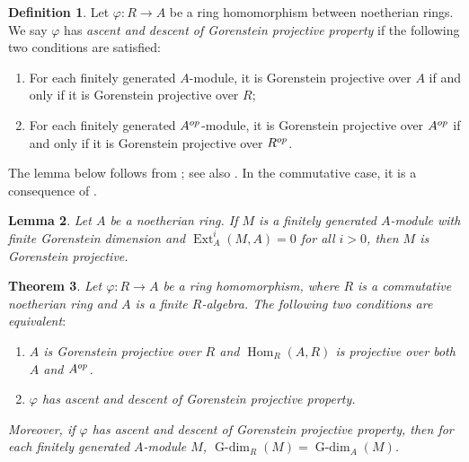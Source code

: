 \documentclass{amsart}
\newcommand{\Z}{\mathbb{Z}}
\newcommand{\D}{\mathsf{D}}
\newcommand{\0}{{\bf{0}}}
\DeclareMathOperator{\Gdim}{G-dim}
\DeclareMathOperator{\Hom}{Hom}
\DeclareMathOperator{\Ext}{Ext}
\DeclareMathOperator{\RHom}{\mathsf{RHom}}
\newtheorem{theorem}{Theorem}[section]
\newtheorem{lemma}[theorem]{Lemma}
\theoremstyle{definition}
\newtheorem{definition}[theorem]{Definition}
\begin{document}
\begin{definition}
Let $\varphi\colon R\rightarrow A$ be a ring homomorphism between noetherian rings.
We say $\varphi$ has \emph{ascent and descent of Gorenstein projective property} if the following two conditions are satisfied$\colon$
\begin{enumerate}
\item For each finitely generated  $A$-module, it is Gorenstein projective over $A$  if and only if it is Gorenstein projective over $R$;

\item For each finitely generated $A^{\rm op}$-module, it is Gorenstein projective over $A^{\rm op}$  if and only if it is Gorenstein projective over $R^{\rm op}$.
\end{enumerate}
\end{definition}



The lemma below follows from  \cite[Theorem 3.1]{CI}; see also \cite[Proposition 9.1.17]{CFH}.
In the commutative case, it is a consequence of \cite[Corollary 2.3.8]{Chr00}.
 
\begin{lemma}\label{TFtest}
Let $A$ be a noetherian ring. If $M$ is a finitely generated  $A$-module with finite Gorenstein dimension and $\Ext^i_A(M,A)=0$ for all $i>0$, then $M$ is Gorenstein projective.
\end{lemma}



\begin{theorem}\label{ADTF}
Let $\varphi\colon R\rightarrow A$ be a ring homomorphism, where $R$ is a commutative noetherian ring and $A$ is a finite $R$-algebra.
The following two conditions are equivalent$\colon$
\begin{enumerate}
\item  $A$ is Gorenstein projective over $R$ and $\Hom_R(A,R)$ is projective over both $A$ and $A^{\rm op}$.

\item $\varphi$ has ascent and descent of Gorenstein projective property.
\end{enumerate}
Moreover, if $\varphi$ has ascent and descent of Gorenstein projective property, then for each finitely generated $A$-module $M$, $\Gdim_R(M)=\Gdim_A(M)$.
\end{theorem}
\end{document}
